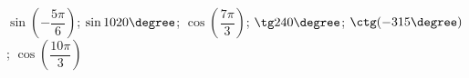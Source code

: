 \begin{ex}[type=calculate]
	\begin{condition}
		\( \sin\left( -\dfrac{5\pi}{6} \right) \); \( \sin1020\degree \); \( \cos\left( \dfrac{7\pi}{3} \right) \); \( \tg240\degree \); \( \ctg(-315\degree) \); \( \cos\left( \dfrac{10\pi}{3} \right) \)
	\end{condition}
\end{ex}